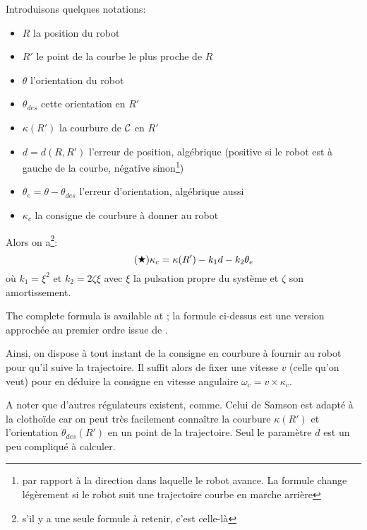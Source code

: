 \documentclass[11pt]{article}
\begin{document}

    Introduisons quelques notations:
    \begin{itemize}
        \item $R$ la position du robot
        \item $R'$ le point de la courbe le plus proche de $R$
        \item $\theta$ l'orientation du robot
        \item $\theta_{des}$ cette orientation en $R'$
        \item $\kappa(R')$ la courbure de $\cal C$ en $R'$
        \item $d = d(R, R')$ l'erreur de position, algébrique (positive si le robot est à gauche de la courbe, négative sinon\footnote{par rapport à la direction dans laquelle le robot avance. La formule change légèrement si le robot suit une trajectoire courbe en marche arrière})
        \item $\theta_e = \theta - \theta_{des}$ l'erreur d'orientation, algébrique aussi
        \item $\kappa_c$ la consigne de courbure à donner au robot
    \end{itemize}

    Alors on a\footnote{s'il y a une seule formule à retenir, c'est celle-là}:
    \begin{equation}
        \tag{\ding{72}}
        \kappa_c = \kappa(R') - k_1d - k_2\theta_e
        \label{equ:samson}
    \end{equation}
    où $k_1 = \xi^2$ et $k_2 = 2\zeta\xi$ avec $\xi$ la pulsation propre du système et $\zeta$ son amortissement.

    The complete formula is available at\cite{samson,samson1995control} ; la formule ci-dessus est une version approchée au premier ordre issue de \cite{gauthier1999utilisation}.

    Ainsi, on dispose à tout instant de la consigne en courbure à fournir au robot pour qu'il suive la trajectoire. Il suffit alors de fixer une vitesse $v$ (celle qu'on veut) pour en déduire la consigne en vitesse angulaire $\omega_c = v \times \kappa_c$.

    A noter que d'autres régulateurs existent, comme\cite{koh1999smooth}. Celui de Samson est adapté à la clothoïde car on peut très facilement connaître la courbure $\kappa(R')$ et l'orientation $\theta_{des}(R')$ en un point de la trajectoire. Seul le paramètre $d$ est un peu compliqué à calculer.
\end{document}
